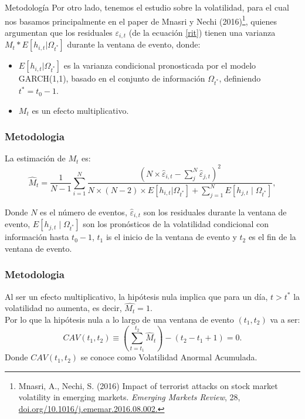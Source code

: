 \documentclass{beamer}
\begin{document}
\begin{frame}{Metodología}
Por otro lado, tenemos el estudio sobre la volatilidad, para el cual nos basamos principalmente en el paper de Mnasri y Nechi (2016)\footnote{Mnasri, A., Nechi, S. (2016)
Impact of terrorist attacks on stock market volatility in emerging markets.
\textit{Emerging Markets Review}, 28,
\href{https://doi.org/10.1016/j.ememar.2016.08.002}{doi.org/10.1016/j.ememar.2016.08.002.}}, quienes argumentan que los residuales $\varepsilon_{i,t}$ (de la ecuación \eqref{rit}) tienen una varianza $M_t*E[h_{i,t}|\Omega_{t^*}]$ durante la ventana de evento, donde:
\begin{itemize}
    \item $E[h_{i,t}|\Omega_{t^*}]$ es la varianza condicional pronosticada por el modelo GARCH(1,1), basado en el conjunto de información $\Omega_{t^*}$, definiendo $t^* = t_0 -1$.
    \item $M_t$ es un efecto multiplicativo.
\end{itemize}

\end{frame}
\begin{frame}
\frametitle{Metodologia}
La estimación de $M_t$ es:
\begin{equation}
\widehat{M}_t=\frac{1}{N-1} \sum_{i=1}^N \frac{\left(N \times \hat{\varepsilon}_{i, t}-\sum_j^N \hat{\varepsilon}_{j, t}\right)^2}{N \times(N-2) \times E\left[h_{i, t}| \Omega_{t^*}\right]+\sum_{j=1}^N E\left[h_{j, t} \mid \Omega_{t^*}\right]},
\end{equation}

Donde $N$ es el número de eventos, $\hat{\varepsilon}_{i,t}$ son los residuales durante la ventana de evento, $E\left[h_{j, t} \mid \Omega_{t^*}\right]$ son los pronósticos de la volatilidad condicional con información hasta $t_0-1$, $t_1$ is el inicio de la ventana de evento y $t_2$ es el fin de la ventana de evento. 
\end{frame}

\begin{frame}
\frametitle{Metodologia}
Al ser un efecto multiplicativo, la hipótesis nula implica que para un día, $t > t^*$ la volatilidad no aumenta, es decir, $\hat{M_t} =1$.\\
Por lo que la hipótesis nula a lo largo de una ventana de evento $(t_1,t_2)$ va a ser: 
\begin{equation}
C A V\left(t_1, t_2\right) \equiv \left(\sum_{t=t_1}^{t_2} \widehat{M}_t\right)-\left(t_2-t_1+1\right) =0. \label{eq_cav}
\end{equation}
Donde $CAV(t_1,t_2)$ se conoce como Volatilidad Anormal Acumulada.
\end{frame}
\end{document}
